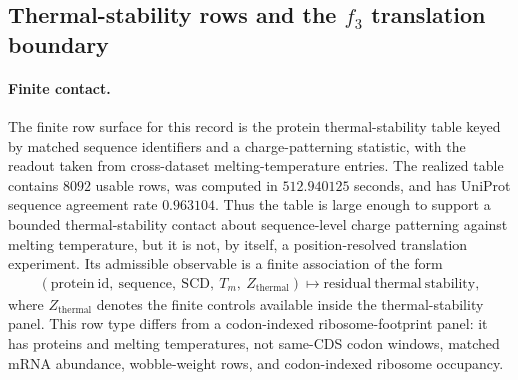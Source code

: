 \subsection{Thermal-stability rows and the $f_3$ translation boundary}
\label{subsec:bioreality-h3-cross-layer-relation-protein-thermal-stability-scd-charge-patterning-tm-crossdataset-meltome}

\paragraph{Finite contact.}
The finite row surface for this record is the protein thermal-stability table keyed by matched sequence identifiers and a charge-patterning statistic, with the readout taken from cross-dataset melting-temperature entries.  The realized table contains $8092$ usable rows, was computed in $512.940125$ seconds, and has UniProt sequence agreement rate $0.963104$.  Thus the table is large enough to support a bounded thermal-stability contact about sequence-level charge patterning against melting temperature, but it is not, by itself, a position-resolved translation experiment.  Its admissible observable is a finite association of the form
$$
\begin{aligned}
  (\mathrm{protein\ id},\ \mathrm{sequence},\ \mathrm{SCD},\ T_m,\ Z_{\mathrm{thermal}})
  \longmapsto
  \mathrm{residual\ thermal\ stability},
\end{aligned}
$$
where $Z_{\mathrm{thermal}}$ denotes the finite controls available inside the thermal-stability panel.  This row type differs from a codon-indexed ribosome-footprint panel: it has proteins and melting temperatures, not same-CDS codon windows, matched mRNA abundance, wobble-weight rows, and codon-indexed ribosome occupancy.

